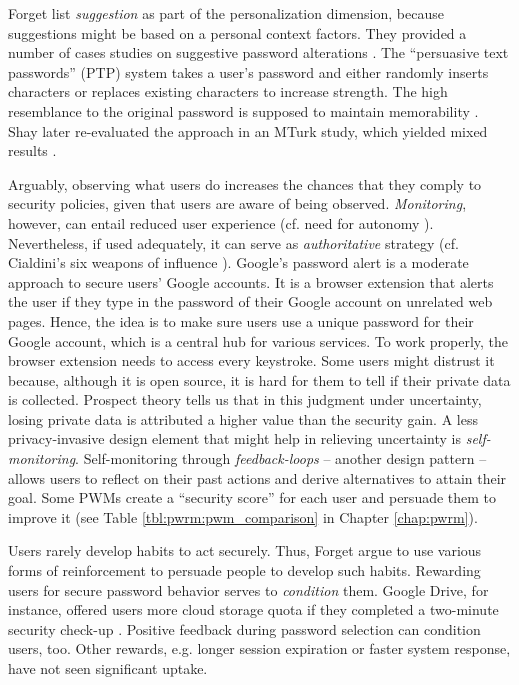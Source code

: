 	Forget \etal list \textit{suggestion} as part of the personalization dimension, because suggestions might be based on a personal context factors. They provided a number of cases studies on suggestive password alterations \cite{Forget2008ImprovingPasswordsThroughPersuasion, Forget2008MemorabilityPersuasivePasswords, Forget2008PersuasionStrongerPasswords}. The ``persuasive text passwords'' (PTP) system takes a user's password and either randomly inserts characters or replaces existing characters to increase strength. The high resemblance to the original password is supposed to maintain memorability \cite{Forget2008MemorabilityPersuasivePasswords}. Shay \etal later re-evaluated the approach in an MTurk study, which yielded mixed results \cite{Shay2015SpoonfulOfSugar}. 
	
	
	Arguably, observing what users do increases the chances that they comply to security policies, given that users are aware of being observed. \textit{Monitoring}, however, can entail reduced user experience (cf. need for autonomy \cite{Ryan2000SelfDeterminationTheory}). Nevertheless, if used adequately, it can serve as \textit{authoritative} strategy (cf. Cialdini's six weapons of influence \cite{Cialdini2007Influence}). Google's password alert is a moderate approach to secure users' Google accounts. It is a browser extension that alerts the user if they type in the password of their Google account on unrelated web pages. Hence, the idea is to make sure users use a unique password for their Google account, which is a central hub for various services. To work properly, the browser extension needs to access every keystroke. Some users might distrust it because, although it is open source, it is hard for them to tell if their private data is collected. Prospect theory tells us that in this judgment under uncertainty, losing private data is attributed a higher value than the security gain. %
	A less privacy-invasive design element that might help in relieving uncertainty is \textit{self-monitoring}. Self-monitoring through \textit{feedback-loops} -- another design pattern \cite{Lidwell2003UniversalPrinciplesOfDesign} -- allows users to reflect on their past actions and derive alternatives to attain their goal. Some \glspl{PWM} create a ``security score'' for each user and persuade them to improve it (see Table \ref{tbl:pwrm:pwm_comparison} in Chapter \ref{chap:pwrm}). 
	
	Users rarely develop habits to act securely. Thus, Forget \etal argue to use various forms of reinforcement to persuade people to develop such habits. Rewarding users for secure password behavior serves to \textit{condition} them. Google Drive, for instance, offered users more cloud storage quota if they completed a two-minute security check-up . Positive feedback during password selection can condition users, too. Other rewards, e.g. longer session expiration or faster system response, have not seen significant uptake. 
	
